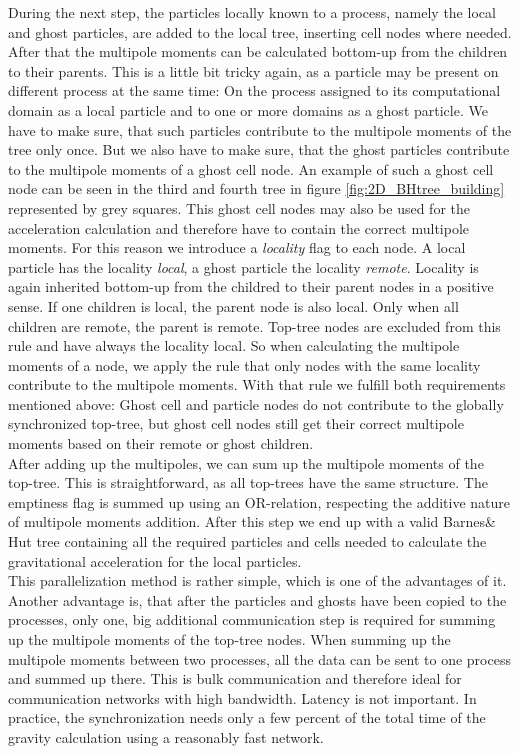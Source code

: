 During the next step, the particles locally known to a process, namely the local and ghost particles, are added to the local tree, inserting cell nodes where needed. After that the multipole moments can be calculated bottom-up from the children to their parents. This is a little bit tricky again, as a particle may be present on different process at the same time: On the process assigned to its computational domain as a local particle and to one or more domains as a ghost particle. We have to make sure, that such particles contribute to the multipole moments of the tree only once. But we also have to make sure, that the ghost particles contribute to the multipole moments of a ghost cell node. An example of such a ghost cell node can be seen in the third and fourth tree in figure \ref{fig:2D_BHtree_building} represented by grey squares. This ghost cell nodes may also be used for the acceleration calculation and therefore have to contain the correct multipole moments. For this reason we introduce a \emph{locality} flag to each node. A local particle has the locality \emph{local}, a ghost particle the locality \emph{remote}. Locality is again inherited bottom-up from the childred to their parent nodes in a positive sense. If one children is local, the parent node is also local. Only when all children are remote, the parent is remote. Top-tree nodes are excluded from this rule and have always the locality local. So when calculating the multipole moments of a node, we apply the rule that only nodes with the same locality contribute to the multipole moments. With that rule we fulfill both requirements mentioned above: Ghost cell and particle nodes do not contribute to the globally synchronized top-tree, but ghost cell nodes still get their correct multipole moments based on their remote or ghost children.\\

After adding up the multipoles, we can sum up the multipole moments of the top-tree. This is straightforward, as all top-trees have the same structure. The emptiness flag is summed up using an OR-relation, respecting the additive nature of multipole moments addition. After this step we end up with a valid Barnes\& Hut tree containing all the required particles and cells needed to calculate the gravitational acceleration for the local particles.\\

This parallelization method is rather simple, which is one of the advantages of it. Another advantage is, that after the particles and ghosts have been copied to the processes, only one, big additional communication step is required for summing up the multipole moments of the top-tree nodes. When summing up the multipole moments between two processes, all the data can be sent to one process and summed up there. This is bulk communication and therefore ideal for communication networks with high bandwidth. Latency is not important. In practice, the synchronization needs only a few percent of the total time of the gravity calculation using a reasonably fast network.\\

